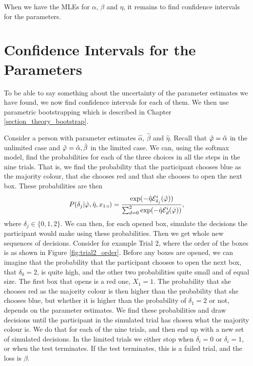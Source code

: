 When we have the MLEs for $\alpha$, $\beta$ and $\eta$, it remains to find confidence intervals for the parameters. 


\section{Confidence Intervals for the Parameters}
\label{chapter:CIs_chap3}
To be able to say something about the uncertainty of the parameter estimates we have found, we now find confidence intervals for each of them. We then use parametric bootstrapping which is described in Chapter \ref{section_theory_bootstrap}.

Consider a person with parameter estimates $\hat{\alpha}$, $\hat{\beta}$ and $\hat{\eta}$. Recall that $\hat{\varphi}=\hat{\alpha}$ in the unlimited case and $\hat{\varphi}=\hat{\alpha},\hat{\beta}$ in the limited case. 
We can, using the softmax model, find the probabilities for each of the three choices in all the steps in the nine trials. That is, we find the probability that the participant chooses blue as the majority colour, that she chooses red and that she chooses to open the next box. These probabilities are then
\begin{equation}
\label{probabilities_bootstrap}
    P(\delta_{j}|\hat{\varphi},\hat{\eta},x_{1:i}) = \frac{\text{exp}(- \hat{\eta} \mathcal{E}^i_{\delta_j}(\hat{\varphi}))}{\sum_{d=0}^{2} \text{exp}(-\hat{\eta} \mathcal{E}^i_{d}(\hat{\varphi}))},
\end{equation}
where $\delta_j \in \{0,1,2 \}$.
We can then, for each opened box, simulate the decisions the participant would make using these probabilities. Then we get whole new sequences of decisions. Consider for example Trial 2, where the order of the boxes is as shown in Figure \ref{fig:trial2_order}. Before any boxes are opened, we can imagine that the probability that the participant chooses to open the next box, that $\delta_0=2$, is quite high, and the other two probabilities quite small and of equal size. The first box that opens is a red one, $X_1=1$. The probability that she chooses red as the majority colour is then higher than the probability that she chooses blue, but whether it is higher than the probability of $\delta_1=2$ or not, depends on the parameter estimates. We find these probabilities and draw decisions until the participant in the simulated trial has chosen what the majority colour is. We do that for each of the nine trials, and then end up with a new set of simulated decisions. In the limited trials we either stop when $\delta_i=0$ or $\delta_i=1$, or when the test terminates. If the test terminates, this is a failed trial, and the loss is $\beta$. 

